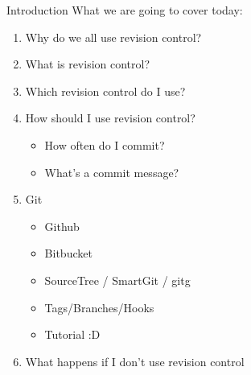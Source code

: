 \begin{frame}{Introduction}
    What we are going to cover today:
    \begin{enumerate}
        \item Why do we all use revision control?
        \item What is revision control?
        \item Which revision control do I use?
        \item How should I use revision control?
        \begin{itemize}
        	\item How often do I commit?
        	\item What's a commit message?
        \end{itemize}
        \item Git
        \begin{itemize}
     	    \item Github
    	    \item Bitbucket
        	\item SourceTree / SmartGit / gitg
        	\item Tags/Branches/Hooks
        	\item Tutorial :D
        \end{itemize}
        \item What happens if I don't use revision control
    \end{enumerate}
\end{frame}
